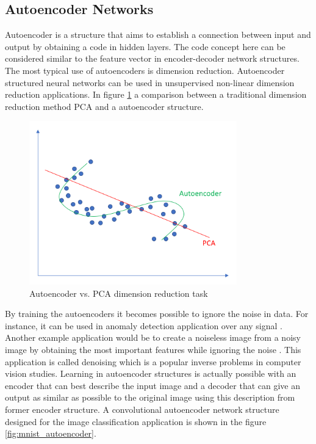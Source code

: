 \subsection{Autoencoder Networks}

Autoencoder is a structure that aims to establish a connection between input and output by obtaining a code in hidden layers. The code concept here can be considered similar to the feature vector in encoder-decoder network structures. The most typical use of autoencoders is dimension reduction. Autoencoder structured neural networks can be used in unsupervised non-linear dimension reduction applications. In figure \ref{fig:autoencoder_vs_pca} a comparison between a traditional dimension reduction method PCA \cite{pca} and a autoencoder structure.

\begin{figure}[h]
    \centering
    \includegraphics[width=9cm]{figures/chapter3/autoencoder_vs_pca.png}
    \caption{Autoencoder vs. PCA dimension reduction task \cite{autoencoder_vs_pca}}
    \label{fig:autoencoder_vs_pca}
\end{figure}

By training the autoencoders it becomes possible to ignore the noise in data. For instance, it can be used in anomaly detection application over any signal \cite{anomaly_detection1} \cite{anomaly_detection2}. Another example application would be to create a noiseless image from a noisy image by obtaining the most important features while ignoring the noise \cite{denoising}. This application is called denoising which is a popular inverse problems in computer vision studies. Learning in autoencoder structures is actually possible with an encoder that can best describe the input image and a decoder that can give an output as similar as possible to the original image using this description from former encoder structure. A convolutional autoencoder network structure designed for the image classification application is shown in the figure \ref{fig:mnist_autoencoder}.

